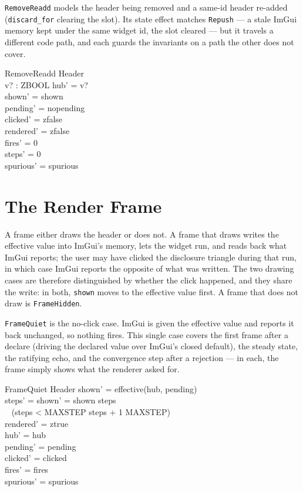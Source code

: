 \documentclass[a4paper,10pt,fleqn]{article}
\begin{document}
\texttt{RemoveReadd} models the header being removed and a same-id header
re-added (\texttt{discard\_for} clearing the slot).  Its state effect matches
\texttt{Repush} --- a stale ImGui memory kept under the same widget id, the
slot cleared --- but it travels a different code path, and each guards the
invariants on a path the other does not cover.

\begin{schema}{RemoveReadd}
  \Delta Header \\
  v? : ZBOOL
\where
  hub' = v? \\
  shown' = shown \\
  pending' = nopending \\
  clicked' = zfalse \\
  rendered' = zfalse \\
  fires' = 0 \\
  steps' = 0 \\
  spurious' = spurious
\end{schema}

\section{The Render Frame}

A frame either draws the header or does not.  A frame that draws writes the
effective value into ImGui's memory, lets the widget run, and reads back what
ImGui reports; the user may have clicked the disclosure triangle during that
run, in which case ImGui reports the opposite of what was written.  The two
drawing cases are therefore distinguished by whether the click happened, and
they share the write: in both, \texttt{shown} moves to the effective value
first.  A frame that does not draw is \texttt{FrameHidden}.

\texttt{FrameQuiet} is the no-click case.  ImGui is given the effective value
and reports it back unchanged, so nothing fires.  This single case covers the
first frame after a declare (driving the declared value over ImGui's closed
default), the steady state, the ratifying echo, and the convergence step after
a rejection --- in each, the frame simply shows what the renderer asked for.

\begin{schema}{FrameQuiet}
  \Delta Header
\where
  shown' = effective(hub, pending) \\
  steps' = \IF shown' = shown \THEN steps \\
\quad~  \ELSE (\IF steps < MAXSTEP \THEN steps + 1 \ELSE MAXSTEP) \\
  rendered' = ztrue \\
  hub' = hub \\
  pending' = pending \\
  clicked' = clicked \\
  fires' = fires \\
  spurious' = spurious
\end{schema}
\end{document}

